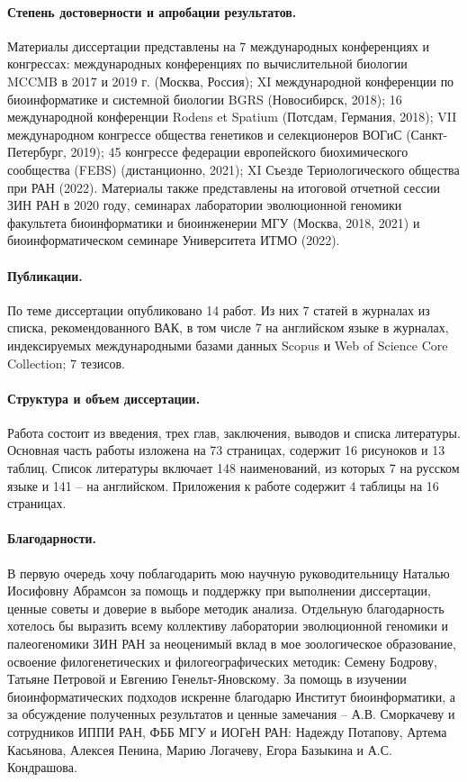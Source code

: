 \paragraph{Степень достоверности и апробации результатов.} Материалы диссертации представлены на 7 международных конференциях и конгрессах: международных конференциях по вычислительной биологии MCCMB в 2017 и 2019 г. (Москва, Россия); XI международной конференции по биоинформатике и системной биологии BGRS (Новосибирск, 2018); 16 международной конференции Rodens et Spatium (Потсдам, Германия, 2018); VII международном конгрессе общества генетиков и селекционеров ВОГиС (Санкт-Петербург, 2019); 45 конгрессе федерации европейского биохимического сообщества (FEBS) (дистанционно, 2021); XI Съезде Териологического общества при РАН (2022). Материалы также представлены на итоговой отчетной сессии ЗИН РАН в 2020 году, семинарах лаборатории эволюционной геномики факультета биоинформатики и биоинженерии МГУ (Москва, 2018, 2021) и биоинформатическом семинаре Университета ИТМО (2022).

\paragraph{Публикации.} По теме диссертации опубликовано 14 работ. Из них 7 статей в журналах из списка, рекомендованного ВАК, в том числе 7 на английском языке в журналах, индексируемых международными базами данных Scopus и Web of Science Core Collection; 7 тезисов.

\paragraph{Структура и объем диссертации.} Работа состоит из введения, трех глав, заключения, выводов и списка литературы. Основная часть работы изложена на 73 страницах, содержит 16 рисуноков и 13 таблиц. Список литературы включает 148 наименований, из которых 7 на русском языке и 141 -- на английском. Приложения к работе содержит 4 таблицы на 16 страницах.

\paragraph{Благодарности.}
В первую очередь хочу поблагодарить мою научную руководительницу Наталью Иосифовну Абрамсон за помощь и поддержку при выполнении диссертации, ценные советы и доверие в выборе методик анализа. Отдельную благодарность хотелось бы выразить всему коллективу лаборатории эволюционной геномики и палеогеномики ЗИН РАН за неоценимый вклад в мое зоологическое образование, освоение филогенетических и филогеографических методик: Семену Бодрову, Татьяне Петровой и Евгению Генельт-Яновскому. За помощь в изучении биоинформатических подходов искренне благодарю Институт биоинформатики, а за обсуждение полученных результатов и ценные замечания -- А.В. Сморкачеву и сотрудников ИППИ РАН, ФББ МГУ и ИОГеН РАН: Надежду Потапову, Артема Касьянова, Алексея Пенина, Марию Логачеву, Егора Базыкина и А.С. Кондрашова.   

